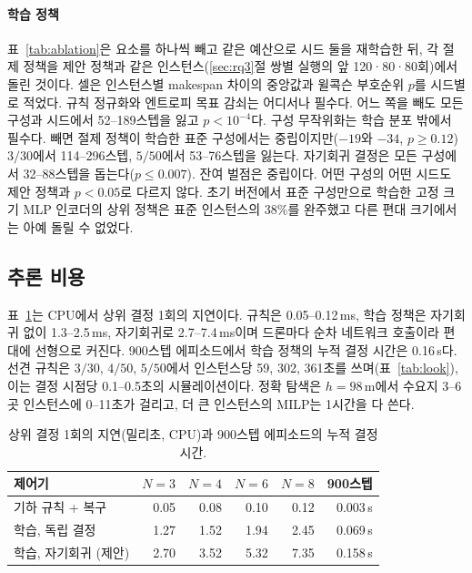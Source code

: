 \documentclass[final,5p,times,twocolumn]{elsarticle}
\begin{document}
\paragraph{학습 정책}
표~\ref{tab:ablation}은 요소를 하나씩 빼고 같은 예산으로 시드 둘을 재학습한 뒤, 각 절제 정책을
제안 정책과 같은 인스턴스(\ref{sec:rq3}절 쌍별 실행의 앞 120·80·80회)에서 돌린 것이다. 셀은
인스턴스별 makespan 차이의 중앙값과 윌콕슨 부호순위 $p$를 시드별로 적었다. 규칙 정규화와
엔트로피 목표 감쇠는 어디서나 필수다. 어느 쪽을 빼도 모든 구성과 시드에서 52--189스텝을 잃고
$p<10^{-4}$다. 구성 무작위화는 학습 분포 밖에서 필수다. 빼면 절제 정책이 학습한 표준 구성에서는
중립이지만($-19$와 $-34$, $p \ge 0.12$) $3/30$에서 114--296스텝, $5/50$에서 53--76스텝을 잃는다.
자기회귀 결정은 모든 구성에서 32--88스텝을 돕는다($p \le 0.007$). 잔여 벌점은 중립이다. 어떤
구성의 어떤 시드도 제안 정책과 $p<0.05$로 다르지 않다. 초기 버전에서 표준 구성만으로 학습한 고정
크기 MLP 인코더의 상위 정책은 표준 인스턴스의 38\%를 완주했고 다른 편대 크기에서는 아예 돌릴 수
없었다.

\begin{table}[t]
\centering
\caption{학습 정책의 절제. 각 셀은 독립 학습한 시드 둘에 대해, 절제 정책과 제안 정책을 같은
인스턴스에서 비교한 인스턴스별 makespan 차이의 중앙값(양수: 뺀 요소가 필요했음)과 윌콕슨 부호순위
$p$다.}
\label{tab:ablation}
\footnotesize

\end{table}

\subsection{추론 비용}
\label{sec:cost}

표~\ref{tab:latency}는 CPU에서 상위 결정 1회의 지연이다. 규칙은 0.05--0.12\,ms, 학습 정책은
자기회귀 없이 1.3--2.5\,ms, 자기회귀로 2.7--7.4\,ms이며 드론마다 순차 네트워크 호출이라 편대에
선형으로 커진다. 900스텝 에피소드에서 학습 정책의 누적 결정 시간은 0.16\,s다. 선견 규칙은 $3/30$, $4/50$, $5/50$에서
인스턴스당 59, 302, 361초를 쓰며(표~\ref{tab:look}), 이는 결정 시점당 0.1--0.5초의 시뮬레이션이다.
정확 탐색은 $h = 98$\,m에서 수요지 3--6곳 인스턴스에 0--11초가 걸리고, 더 큰 인스턴스의 MILP는
1시간을 다 쓴다.

\begin{table}[t]
\centering
\caption{상위 결정 1회의 지연(밀리초, CPU)과 900스텝 에피소드의 누적 결정 시간.}
\label{tab:latency}
\small
\begin{tabular}{lrrrrr}
\toprule
제어기 & $N=3$ & $N=4$ & $N=6$ & $N=8$ & 900스텝 \\
\midrule
기하 규칙 + 복구 & 0.05 & 0.08 & 0.10 & 0.12 & 0.003\,s \\
학습, 독립 결정 & 1.27 & 1.52 & 1.94 & 2.45 & 0.069\,s \\
학습, 자기회귀 (제안) & 2.70 & 3.52 & 5.32 & 7.35 & 0.158\,s \\
\bottomrule
\end{tabular}
\end{table}
\end{document}
